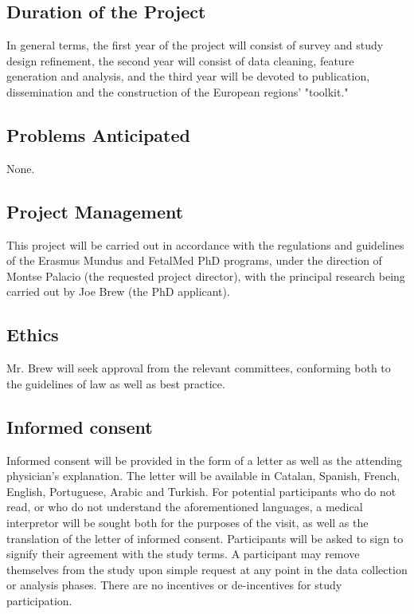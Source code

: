 \documentclass{article}
\begin{document}
\begin{multicols}{2}
\subsection*{Duration of the Project}

In general terms, the first year of the project will consist of survey and study design refinement, the second year will consist of data cleaning, feature generation and analysis, and the third year will be devoted to publication, dissemination and the construction of the European regions' "toolkit."  

\subsection*{Problems Anticipated}

None.

\subsection*{Project Management}

This project will be carried out in accordance with the regulations and guidelines of the Erasmus Mundus and FetalMed PhD programs, under the direction of Montse Palacio (the requested project director), with the principal research being carried out by Joe Brew (the PhD applicant). 

\subsection*{Ethics}

Mr. Brew will seek approval from the relevant committees, conforming both to the guidelines of law as well as best practice.


\subsection*{Informed consent}
Informed consent will be provided in the form of a letter as well as the attending physician's explanation.  The letter will be available in Catalan, Spanish, French, English, Portuguese, Arabic and Turkish.  For potential participants who do not read, or who do not understand the aforementioned languages, a medical interpretor will be sought both for the purposes of the visit, as well as the translation of the letter of informed consent.  Participants will be asked to sign to signify their agreement with the study terms.  A participant may remove themselves from the study upon simple request at any point in the data collection or analysis phases.  There are no incentives or de-incentives for study participation.  



\end{multicols}
\end{document}

